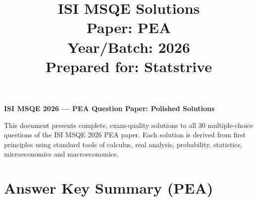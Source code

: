 \documentclass[11pt]{article}
\title{\textbf{ISI MSQE Solutions}\\[4pt]
\large Paper: PEA \\
\large Year/Batch: 2026 \\
\large Prepared for: Statstrive}
\author{}
\date{}
\begin{document}
\maketitle
\thispagestyle{empty}

\vspace{0.6cm}

\begin{center}
\large \textbf{ISI MSQE 2026 --- PEA Question Paper: Polished Solutions}
\end{center}

\vspace{0.4cm}

This document presents complete, exam-quality solutions to all 30 multiple-choice
questions of the ISI MSQE 2026 PEA paper. Each solution is derived from first
principles using standard tools of calculus, real analysis, probability,
statistics, microeconomics and macroeconomics.

\newpage

\section*{Answer Key Summary (PEA)}
\end{document}
